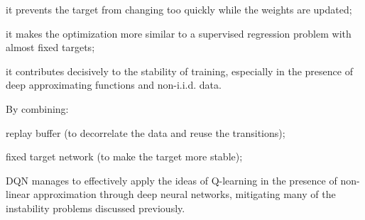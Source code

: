 \begin{compactitemize}
    \item it prevents the target from changing too quickly while the weights are updated;
    \item it makes the optimization more similar to a supervised regression problem with almost fixed targets;
    \item it contributes decisively to the stability of training, especially in the presence of deep approximating functions and non-i.i.d. data.
\end{compactitemize}

By combining:

\begin{compactitemize}
    \item replay buffer (to decorrelate the data and reuse the transitions);
    \item fixed target network (to make the target more stable);
\end{compactitemize}

DQN manages to effectively apply the ideas of Q-learning in the presence of non-linear approximation through deep neural networks, mitigating many of the instability problems discussed previously.
